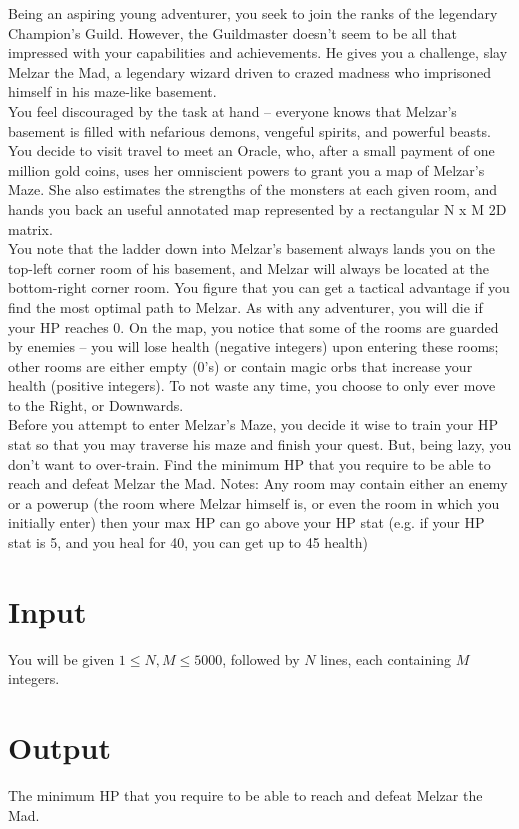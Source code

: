 
\noindent Being an aspiring young adventurer, you seek to join the ranks of the legendary Champion’s Guild. However,
the Guildmaster doesn’t seem to be all that impressed with your capabilities and achievements. He gives you a challenge,
 slay Melzar the Mad, a legendary wizard driven to crazed madness who imprisoned himself in his maze-like basement. \\

\noindent You feel discouraged by the task at hand – everyone knows that Melzar’s basement is filled with nefarious
demons, vengeful spirits, and powerful beasts. You decide to visit travel to meet an Oracle, who, after a small payment
of one million gold coins, uses her omniscient powers to grant you a map of Melzar’s Maze. She also estimates the
strengths of the monsters at each given room, and hands you back an useful annotated map represented by a rectangular
N x M 2D matrix. \\

\noindent You note that the ladder down into Melzar's basement always lands you on the top-left corner room of his
basement, and Melzar will always be located at the bottom-right corner room. You figure that you can get a tactical
advantage if you find the most optimal path to Melzar. As with any adventurer, you will die if your HP reaches 0. On
the map, you notice that some of the rooms are guarded by enemies – you will lose health (negative integers) upon
entering these rooms; other rooms are either empty (0's) or contain magic orbs that increase your health (positive
integers). To not waste any time, you choose to only ever move to the Right, or Downwards. \\

\noindent Before you attempt to enter Melzar’s Maze, you decide it wise to train your HP stat so that you may traverse
his maze and finish your quest. But, being lazy, you don’t want to over-train. Find the minimum HP that you require to
be able to reach and defeat Melzar the Mad. Notes: Any room may contain either an enemy or a powerup (the room where
Melzar himself is, or even the room in which you initially enter) then your max HP can go above your HP stat
(e.g. if your HP stat is 5, and you heal for 40, you can get up to 45 health)


\section*{Input}
You will be given $1 \leq N,M \leq 5000$, followed by $N$ lines, each containing $M$  integers.
\section*{Output}
The minimum HP that you require to be able to reach and defeat Melzar the Mad.
